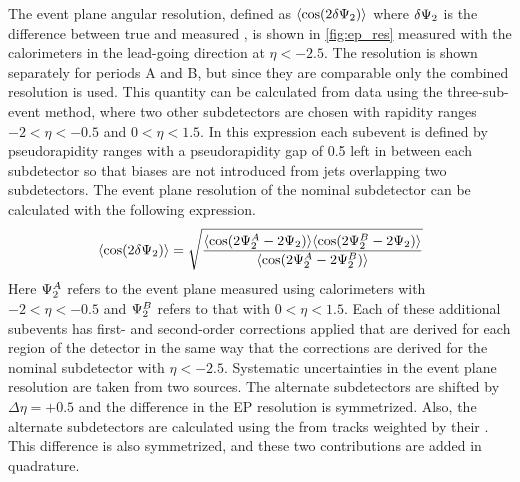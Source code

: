 The event plane angular resolution, defined as $\langle \cos(2 \delta \Psi_{2}) \rangle$ where $\delta \Psi_{2}$ is the difference between true and measured \psit, is shown in \cref{fig:ep_res} measured with the calorimeters in the lead-going direction at $\eta < -2.5$.
The resolution is shown separately for periods A and B, but since they are comparable only the combined resolution is used.
This quantity can be calculated from data using the three-sub-event method, where two other subdetectors are chosen with rapidity ranges $-2 < \eta< -0.5$ and $0 < \eta < 1.5$.
In this expression each subevent is defined by pseudorapidity ranges with a pseudorapidity gap of 0.5 left in between each subdetector so that biases are not introduced from jets overlapping two subdetectors.
The event plane resolution of the nominal subdetector can be calculated with the following expression.
\begin{equation}
\langle \cos(2 \delta \Psi_{2}) \rangle = \sqrt{ \frac{\langle \cos(2\Psi_{2}^A - 2\Psi_{2}) \rangle \langle \cos(2\Psi_{2}^B - 2\Psi_{2}) \rangle }{\langle \cos(2\Psi_{2}^A - 2\Psi_{2}^B) \rangle} }\\
\end{equation}
Here $\Psi_{2}^A$ refers to the event plane measured using calorimeters with $-2 < \eta< -0.5$ and $\Psi_{2}^B$ refers to that with $0 < \eta < 1.5$.
Each of these additional subevents has first- and second-order corrections applied that are derived for each region of the detector in the same way that the corrections are derived for the nominal subdetector with $\eta < -2.5$.
Systematic uncertainties in the event plane resolution are taken from two sources.
The alternate subdetectors are shifted by $\Delta\eta = +0.5$ and the difference in the EP resolution is symmetrized.
Also, the alternate subdetectors are calculated using the \qt from tracks weighted by their \pt.
This difference is also symmetrized, and these two contributions are added in quadrature.


\FloatBarrier
